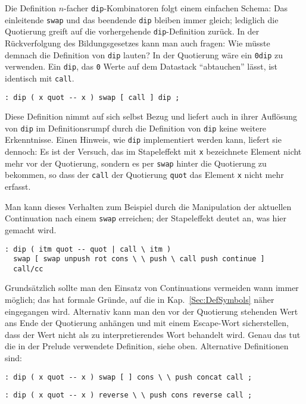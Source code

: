 Die Definition $n$-facher \verb|dip|-Kombinatoren folgt einem einfachen Schema: Das einleitende \verb|swap| und das beendende \verb|dip| bleiben immer gleich; lediglich die Quotierung greift auf die vorhergehende \verb|dip|-Definition zurück. In der Rückverfolgung des Bildungsgesetzes kann man auch fragen: Wie müsste demnach die Definition von \verb|dip| lauten? In der Quotierung wäre ein \verb|0dip| zu verwenden. Ein \verb|dip|, das \verb|0| Werte auf dem Datastack "`abtauchen"' lässt, ist identisch mit \verb|call|.

\begin{verbatim}
: dip ( x quot -- x ) swap [ call ] dip ;
\end{verbatim}

Diese Definition nimmt auf sich selbst Bezug und liefert auch in ihrer Auflösung von \verb|dip| im Definitionsrumpf durch die Definition von \verb|dip| keine weitere Erkenntnisse. Einen Hinweis, wie \verb|dip| implementiert werden kann, liefert sie dennoch: Es ist der Versuch, das im Stapeleffekt mit \verb|x| bezeichnete Element nicht mehr vor der Quotierung, sondern es per \verb|swap| hinter die Quotierung zu bekommen, so dass der \verb|call| der Quotierung \verb|quot| das Element \verb|x| nicht mehr erfasst.

Man kann dieses Verhalten zum Beispiel durch die Manipulation der aktuellen Continuation nach einem \verb|swap| erreichen; der Stapeleffekt deutet an, was hier gemacht wird.

\begin{verbatim}
: dip ( itm quot -- quot | call \ itm )
  swap [ swap unpush rot cons \ \ push \ call push continue ]
  call/cc
\end{verbatim}

Grundsätzlich sollte man den Einsatz von Continuations vermeiden wann immer möglich; das hat formale Gründe, auf die in Kap.~\ref{Sec:DefSymbols} näher eingegangen wird.
Alternativ kann man den vor der Quotierung stehenden Wert ans Ende der Quotierung anhängen und mit einem Escape-Wort sicherstellen, dass der Wert nicht als zu interpretierendes Wort behandelt wird. Genau das tut die in der Prelude verwendete Definition, siehe oben. Alternative Definitionen sind:

\begin{verbatim}
: dip ( x quot -- x ) swap [ ] cons \ \ push concat call ;
\end{verbatim}

\begin{verbatim}
: dip ( x quot -- x ) reverse \ \ push cons reverse call ;
\end{verbatim}

